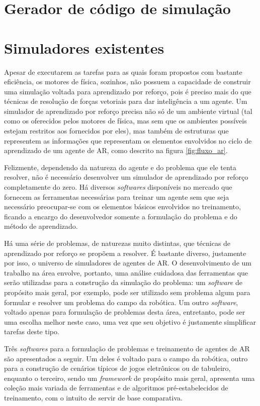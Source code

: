 \documentclass[cic,tc]{iiufrgs}
\begin{document}
\section{Gerador de código de simulação}


\section{Simuladores existentes}
Apesar de executarem as tarefas para as quais foram propostos com bastante
eficiência, os motores de física, sozinhos, não possuem a capacidade de
construir uma simulação voltada para aprendizado por reforço, pois é preciso
mais do que técnicas de resolução de forças vetoriais para dar inteligência a um
agente. Um simulador de aprendizado por reforço precisa não só de um ambiente
virtual (tal como os oferecidos pelos motores de física, mas sem que os
ambientes possíveis estejam restritos aos fornecidos por eles), mas também de
estruturas que representem as informações que representam os elementos
envolvidos no ciclo de aprendizado de um agente de AR, como descrito na figura
\ref{fig:fluxo_ar}.


Felizmente, dependendo da natureza do agente e do problema que ele tenta
resolver, não é necessário desenvolver um simulador de aprendizado por reforço
completamente do zero. Há diversos \textit{softwares} disponíveis no mercado que
fornecem as ferramentas necessárias para treinar um agente sem que seja
necessário preocupar-se com os elementos básicos envolvidos no treinamento,
ficando a encargo do desenvolvedor somente a formulação do problema e do método
de aprendizado.


Há uma série de problemas, de naturezas muito distintas, que técnicas de
aprendizado por reforço se propõem a resolver. É bastante diverso, justamente
por isso, o universo de simuladores de agentes de AR. O desenvolvimento de um
trabalho na área envolve, portanto, uma análise cuidadosa das ferramentas que
serão utilizadas para a construção da simulação do problema: um
\textit{software} de propósito mais geral, por exemplo, pode ser utilizado sem
problema algum para formular e resolver um problema do campo da robótica. Um
outro \textit{software}, voltado apenas para formulação de problemas desta área,
entretanto, pode ser uma escolha melhor neste caso, uma vez que seu objetivo é
justamente simplificar tarefas deste tipo.


Três \textit{softwares} para a formulação de problemas e treinamento de agentes
de AR são apresentados a seguir. Um deles é voltado para o campo da robótica,
outro para a construção de cenários típicos de jogos eletrônicos ou de
tabuleiro, enquanto o terceiro, sendo um \textit{framework} de propósito mais
geral, apresenta uma coleção mais variada de ferramentas e de algoritmos
pré-estabelecidos de treinamento, com o intuito de servir de base comparativa.
\end{document}
